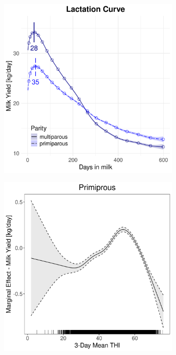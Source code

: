 \begin{figure}[H]
\begin{subfigure}[b]{0.45\textwidth}
        \includegraphics[width=\textwidth]{thesis/figures/models/milk/before2010/ho_milk_before2010/ho_milk_before2010_marginal_dim_milk_combined.png}
    \end{subfigure}
    \begin{subfigure}[b]{0.45\textwidth}
        \centering
        \includegraphics[width=\textwidth]{thesis/figures/models/milk/before2010/ho_milk_before2010/ho_milk_before2010_marginal_thi_milk_primi.png}

\end{subfigure}
\end{figure}

